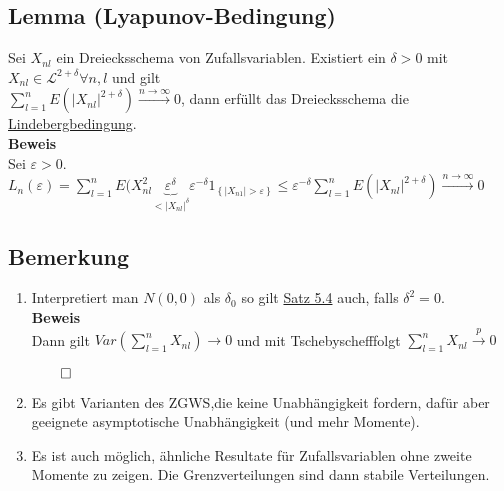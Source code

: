 \documentclass[german,10pt,oneside, fleqn, a4paper]{article}
\newcommand{\tscheb}{Tschebyscheff}
\newcommand{\ra}{\rightarrow}
\newcommand{\sm}[2][\infty]{\sum\limits_{#2}^{#1}}
\newcommand{\brc}[1]{\left(#1\right)}
\newcommand{\brac}[1]{\left\lbrace #1\right\rbrace}
\newcommand{\QED}{\begin{flushright}$\qed$\end{flushright}}
\newcommand{\mc}[1]{\mathcal{#1}}
\newcommand{\lp}[1]{\mc{L}^{#1}}
\newcommand{\beweis}{\textbf{Beweis}\\}
\newcommand{\toinf}{\rightarrow\infty}
\newcommand{\1}[1]{1_{#1}}
\newcommand{\2}[1]{\1{\brac{#1}}}
\newcommand{\xr}[2][]{\xrightarrow[#1]{#2}}
\begin{document}
\subsection{Lemma (Lyapunov-Bedingung)}
\label{5.7}
Sei $X_{nl}$ ein Dreiecksschema von Zufallsvariablen. Existiert ein $\delta>0$ mit $X_{nl}\in\lp{2+\delta}\forall n,l$ und gilt\\
$\sm[n]{l=1}E\brc{\vert X_{nl}\vert^{2+\delta}}\xr{n\toinf}0$, dann erfüllt das Dreiecksschema die \hyperref[5.4]{Lindebergbedingung}.\\
\beweis
Sei $\varepsilon>0$.\\
$L_n(\varepsilon)=\sm[n]{l=1}E(X_{nl}^2\underbrace{\varepsilon^\delta}_{<|X_{nl}|^\delta}\varepsilon^{-\delta}\1{\brac{|X_{n1}|>\varepsilon}}\leq\varepsilon^{-\delta}\sm[n]{l=1}E\brc{|X_{nl}|^{2+\delta}}\xr{n\toinf}0$

\subsection{Bemerkung}
\label{5.8}
\begin{enumerate}[label=(\alph*)]
\item Interpretiert man $N(0,0)$ als $\delta_0$ so gilt \hyperref[5.4]{Satz 5.4} auch, falls $\delta^2=0$.\\
\beweis
Dann gilt $Var\brc{\sm[n]{l=1}X_{nl}}\ra 0$ und mit \tscheb folgt $\sm[n]{l=1}X_{nl}\xr{p}0$\QED
\item Es gibt Varianten des ZGWS,die keine Unabhängigkeit fordern, dafür aber geeignete asymptotische Unabhängigkeit (und mehr Momente).
\item Es ist auch möglich, ähnliche Resultate für Zufallsvariablen ohne zweite Momente zu zeigen. Die Grenzverteilungen sind dann stabile Verteilungen.
\end{enumerate}
\end{document}
